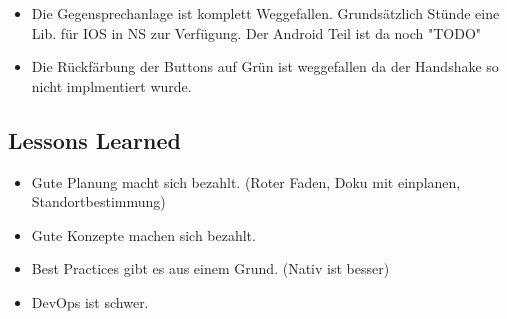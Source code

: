 \begin{itemize}
    \item Die Gegensprechanlage ist komplett Weggefallen.
    \subitem Grundsätzlich Stünde eine Lib. für IOS in NS zur Verfügung. Der Android Teil ist da noch "TODO"
    \item Die Rückfärbung der Buttons auf Grün ist weggefallen da der Handshake so nicht implmentiert wurde.
\end{itemize}


\subsection{Lessons Learned}

\begin{itemize}
    \item Gute Planung macht sich bezahlt. (Roter Faden, Doku mit einplanen, Standortbestimmung)
    \item Gute Konzepte machen sich bezahlt.
    \item Best Practices gibt es aus einem Grund. (Nativ ist besser)
    \item DevOps ist schwer.
\end{itemize}





